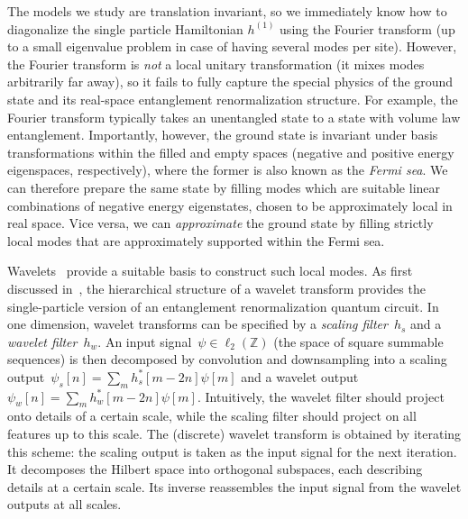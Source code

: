 \documentclass[aps,pra,reprint,superscriptaddress,floatfix,amsmath,amssymb,amsfonts]{revtex4-1}
\newcommand*{\Z}{\mathbb Z}
\begin{document}
The models we study are translation invariant, so we immediately know how to diagonalize the single particle Hamiltonian $h^{(1)}$ using the Fourier transform (up to a small eigenvalue problem in case of having several modes per site).
However, the Fourier transform is \emph{not} a local unitary transformation (it mixes modes arbitrarily far away), so it fails to fully capture the special physics of the ground state and its real-space entanglement renormalization structure.
For example, the Fourier transform typically takes an unentangled state to a state with volume law entanglement.
Importantly, however, the ground state is invariant under basis transformations within the filled and empty spaces (negative and positive energy eigenspaces, respectively), where the former is also known as the \emph{Fermi sea}.
We can therefore prepare the same state by filling modes which are suitable linear combinations of negative energy eigenstates, chosen to be approximately local in real space.
Vice versa, we can \emph{approximate} the ground state by filling strictly local modes that are approximately supported within the Fermi sea.

Wavelets~\cite{mallat2008wavelet} provide a suitable basis to construct such local modes.
As first discussed in~\cite{evenbly2016entanglement}, the hierarchical structure of a wavelet transform provides the single-particle version of an entanglement renormalization quantum circuit.
In one dimension, wavelet transforms can be specified by a \emph{scaling filter}~$h_s$ and a \emph{wavelet filter}~$h_w$.
An input signal~$\psi\in\ell_2(\Z)$ (the space of square summable sequences) is then decomposed by convolution and downsampling into a scaling output~$\psi_s[n] = \sum_m h^*_s[m-2n] \psi[m]$ and a wavelet output~$\psi_w[n] = \sum_m h^*_w[m-2n] \psi[m]$.
Intuitively, the wavelet filter should project onto details of a certain scale, while the scaling filter should project on all features up to this scale.
The (discrete) wavelet transform is obtained by iterating this scheme: the scaling output is taken as the input signal for the next iteration.
It decomposes the Hilbert space into orthogonal subspaces, each describing details at a certain scale.
Its inverse reassembles the input signal from the wavelet outputs at all scales. %
\end{document}
